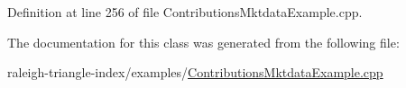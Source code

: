 Definition at line 256 of file Contributions\+Mktdata\+Example.\+cpp.



The documentation for this class was generated from the following file\+:\begin{DoxyCompactItemize}
\item 
raleigh-\/triangle-\/index/examples/\hyperlink{_contributions_mktdata_example_8cpp}{Contributions\+Mktdata\+Example.\+cpp}\end{DoxyCompactItemize}
